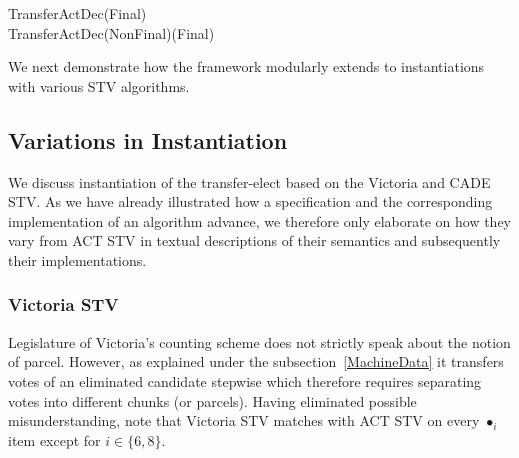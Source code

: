 \documentclass[10pt,conference]{IEEEtran}
\renewcommand{\HOLConst}[1]{{\textsf{\upshape #1}}}
\renewcommand{\HOLSymConst}[1]{\HOLConst{#1}}
\begin{document}
\begin{small}
\begin{holthmenv}
\HOLConst{TransferActDec}\;\;(\HOLConst{Final}\;)\;\;\HOLSymConst{\HOLTokenEquiv{}}\;\HOLConst{false}\\
\HOLConst{TransferActDec}\;\;(\HOLConst{NonFinal}\;)\;(\HOLConst{Final}\;)\;\HOLSymConst{\HOLTokenEquiv{}}\;\HOLConst{false}
\end{holthmenv}
\end{small}
We next demonstrate how the framework modularly extends to instantiations  with various STV algorithms.
\subsection{Variations in Instantiation}
We discuss instantiation of the transfer-elect  based on the Victoria and CADE STV. As we have already illustrated how a specification and the corresponding implementation of an algorithm advance, we therefore only elaborate on how they vary from ACT STV in textual descriptions of their semantics and subsequently their implementations. 
\subsubsection{Victoria STV}
Legislature of Victoria's counting scheme does not strictly speak about the notion of parcel. However, as explained under the subsection~\ref{MachineData} it transfers votes of an eliminated candidate stepwise which therefore requires separating votes into different chunks (or parcels). Having eliminated possible misunderstanding, note that Victoria STV matches with ACT STV  on every $\bullet_{i}$ item except for $i\in\{6,8\}$.
\end{document}
